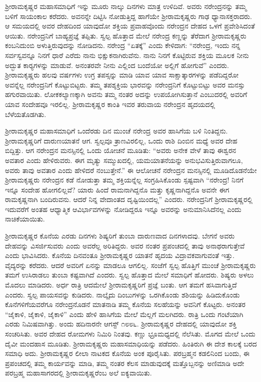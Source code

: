 ಶ‍್ರೀರಾಮಕೃಷ್ಣರ ಮಹಾಸಮಾಧಿಗೆ ಇನ್ನು ಮೂರು ನಾಲ್ಕು ದಿನಗಳು ಮಾತ್ರ ಉಳಿದಿವೆ. ಅವರು ನರೇಂದ್ರನನ್ನು ತಮ್ಮ ಬಳಿಗೆ ಸಾಯಂಕಾಲ ಕರೆದರು. ಅವನನ್ನೇ ದಿಟ್ಟಿಸಿ ನೋಡುತ್ತಿದ್ದ ಹಾಗೆಯೇ ಶ‍್ರೀರಾಮಕೃಷ್ಣರು ಗಾಢ ಧ್ಯಾನಾಸಕ್ತರಾದರು. ಆ ಸಮಯದಲ್ಲಿ ಅವರ ದೇಹದಿಂದ ಯಾವುದೋ ಶಕ್ತಿಯ ಪ್ರವಾಹವೊಂದು ನರೇಂದ್ರನ ದೇಹದ ಒಳಗೆ ಪ್ರವೇಶಿಸಿದಂತೆ ಆಯಿತು. ನರೇಂದ್ರನಿಗೆ ಬಾಹ್ಯಪ್ರಜ್ಞೆ ತಪ್ಪಿತು. ಸ್ವಲ್ಪ ಹೊತ್ತಾದ ಮೇಲೆ ನರೇಂದ್ರ ಕಣ್ಣನ್ನು ತೆರೆದಾಗ ಶ‍್ರೀರಾಮಕೃಷ್ಣರು ಕಂಬನಿದುಂಬಿ ಅಳುತ್ತಿರುವುದನ್ನು ನೋಡಿದನು. ನರೇಂದ್ರ “ಏತಕ್ಕೆ” ಎಂದು ಕೇಳಿದಾಗ: “ನರೇಂದ್ರ, ಇಂದು ನನ್ನ ಸರ್ವಸ್ವವನ್ನೂ ನಿನಗೆ ಧಾರೆ ಎರೆದು ನಾನು ಭಿಕ್ಷುಕನಾಗಿರುವೆನು. ನಾನು ನಿನಗೆ ಕೊಟ್ಟಿರುವ ಶಕ್ತಿಯ ಮೂಲಕ ನೀನು ಅದ್ಭುತ ಕಾರ‍್ಯಗಳನ್ನು ಮಾಡುವೆ. ಅನಂತರವೇ ನೀನು ಎಲ್ಲಿಂದ ಬಂದೆಯೋ ಅಲ್ಲಿಗೆ ಹೋಗುವೆ” ಎಂದರು. ಶ‍್ರೀರಾಮಕೃಷ್ಣರು ಹಲವು ವರ್ಷಗಳು ಉಗ್ರ ತಪಸ್ಸನ್ನು ಮಾಡಿ ಯಾವ ಯಾವ ಸಾಕ್ಷಾತ್ಕಾರಗಳನ್ನು ಪಡೆದಿದ್ದರೋ ಅವನ್ನೆಲ್ಲ ನರೇಂದ್ರನಿಗೆ ಕೊಟ್ಟುಬಿಟ್ಟರು. ತಮ್ಮ ತಪಶ್ಶಕ್ತಿಯ ಭಾರವನ್ನು ನರೇಂದ್ರನಿಗೆ ಕೊಟ್ಟುಬಿಟ್ಟು ಅವರ ಮನಸ್ಸು ಹಗುರವಾಯಿತು. ಲೋಕಕಲ್ಯಾಣಕ್ಕಾಗಿ ಅವನು ತಮ್ಮ ನಂತರ ಅದನ್ನು ಉಪಯೋಗಿಸುತ್ತಾನೆ ಎಂಬುದರಲ್ಲಿ ಅವರಿಗೆ ಯಾವ ಸಂದೇಹವೂ ಇರಲಿಲ್ಲ. ಶ‍್ರೀರಾಮಕೃಷ್ಣರ ಕಾಂತಿ ಇವರ ತರುವಾಯ ನರೇಂದ್ರನ ಹೃದಯದಲ್ಲಿ ಬೆಳೆಯತೊಡಗಿತು.

ಶ‍್ರೀರಾಮಕೃಷ್ಣರ ಮಹಾಸಮಾಧಿಗೆ ಒಂದೆರಡು ದಿನ ಮುಂಚೆ ನರೇಂದ್ರ ಅವರ ಹಾಸಿಗೆಯ ಬಳಿ ನಿಂತಿದ್ದನು. ಶ‍್ರೀರಾಮಕೃಷ್ಣರಿಗೆ ದಾರುಣಯಾತನೆ ಆಗ. ಸ್ವಲ್ಪವೂ ತ್ರಾಣವಿರಲಿಲ್ಲ, ಒಂದು ರಾಶಿ ದಿಂಬಿನ ಮಧ್ಯೆ ಅವರ ದೇಹ ಬಿದ್ದಿತ್ತು. ಆಗ ನರೇಂದ್ರನ ಮನಸ್ಸಿನಲ್ಲಿ ಒಂದು ಯೋಚನೆ ಮೂಡಿತು: “ಅವರು ಅನೇಕ ವೇಳೆ ತಾವು ಈಶ್ವರನ ಅವತಾರ ಎಂದು ಹೇಳಿರುವರು. ಈಗ ಮೃತ್ಯು ಸಮ್ಮುಖದಲ್ಲಿ, ಯಮಯಾತನೆಯನ್ನು ಅನುಭವಿಸುತ್ತಿರುವಾಗಲೂ, ಅವರು ತಾವು ಅವತಾರ ಎಂದು ಹೇಳಿದರೆ ನಂಬುತ್ತೇನೆ.” ಈ ಆಲೋಚನೆ ನರೇಂದ್ರನ ಮನಸ್ಸಿನಲ್ಲಿ ಮೂಡಿದೊಡನೆಯೇ ಶ‍್ರೀರಾಮಕೃಷ್ಣರು ನರೇಂದ್ರನ ಕಡೆ ನೋಡುತ್ತಾ ತಮ್ಮ ಶಕ್ತಿಯನ್ನೆಲ್ಲ ಸಂಗ್ರಹಿಸಿಕೊಂಡು ಸ್ಪಷ್ಟವಾಗಿ “ನರೇಂದ್ರ! ನಿನಗೆ ಇನ್ನೂ ಸಂದೇಹ ಹೋಗಲಿಲ್ಲವೆ? ಯಾರು ಹಿಂದೆ ರಾಮನಾಗಿದ್ದನೊ ಮತ್ತು ಕೃಷ್ಣನಾಗಿದ್ದನೊ ಅವನೇ ಈಗ ರಾಮಕೃಷ್ಣನಾಗಿ ಬಂದಿರುವನು. ಆದರೆ ನಿನ್ನ ವೇದಾಂತದ ದೃಷ್ಟಿಯಿಂದಲ್ಲ” ಎಂದರು. ನರೇಂದ್ರನಿಗೆ ಶ‍್ರೀರಾಮಕೃಷ್ಣರಲ್ಲಿ ಇದುವರೆಗೆ ಅಂತಹ ಆಧ್ಯಾತ್ಮಿಕ ಆವಿರ್ಭಾವಗಳನ್ನು ನೋಡಿದ್ದರೂ ಇನ್ನೂ ಅವರನ್ನು ಅನುಮಾನಿಸಿದೆನಲ್ಲ ಎಂದು ನಾಚಿಕೆಯಾಯಿತು.

ಶ‍್ರೀರಾಮಕೃಷ್ಣರ ಕೊನೆಯ ಎರಡು ದಿನಗಳು ಶಿಷ್ಯರಿಗೆ ತುಂಬಾ ದಾರುಣವಾದ ದಿನಗಳಾದವು. ಬೇಗನೆ ಅವರು ದೇಹವನ್ನು ವಿಸರ್ಜಿಸುವರು ಎಂದು ಅವರೆಲ್ಲ ಅರಿತಿದ್ದರು. ಅವರ ನಂತರ ಪ್ರಪಂಚದಲ್ಲಿ ತಾವು ಅನಾಥರಾಗುತ್ತೇವೆ ಎಂದು ಭಾವಿಸಿದರು. ಕೊನೆಯ ದಿನವಂತೂ ಶ‍್ರೀರಾಮಕೃಷ್ಣರ ಯಾತನೆ ಹೃದಯ ವಿದ್ರಾವಕವಾಗುವಂತೆ ಇತ್ತು. ವೈದ್ಯರನ್ನು ಕರೆದರು. ಆದರೆ ಅವರಿಗೆ ಏನನ್ನು ಮಾಡಲೂ ಆಗಲಿಲ್ಲ. ಸಂಜೆಗೆ ಸ್ವಲ್ಪ ಹೊತ್ತಿಗೆ ಮುಂಚೆ ಶ‍್ರೀರಾಮಕೃಷ್ಣರು ತಮಗೆ ಉಸಿರಾಡಲು ತುಂಬಾ ಕಷ್ಟವಾಗಿದೆ ಎಂದರು. ಸ್ವಲ್ಪ ಹೊತ್ತಾದ ಮೇಲೆ ಸಮಾಧಿಗೆ ಹೋದರು. ಶಿಷ್ಯರು ಅಳಲು ಮೊದಲು ಮಾಡಿದರು. ಅರ್ಧ ರಾತ್ರಿ ಆದಮೇಲೆ ಶ‍್ರೀರಾಮಕೃಷ್ಣರಿಗೆ ಪ್ರಜ್ಞೆ ಬಂತು. ಆಗ ತಮಗೆ ಹಸಿವಾಗುತ್ತಿದೆ ಎಂದರು. ಸ್ವಲ್ಪ ಪಾಯಸವನ್ನು ಕುಡಿದರು. ನಾಲ್ಕೈದು ದಿಂಬುಗಳನ್ನು ಒರಗಿಕೊಂಡು ಶಶಿಯನ್ನು ಹಿಡಿದುಕೊಂಡು ಕೊನೆಗಳಿಗೆಯವರೆಗೂ ನರೇಂದ್ರನೊಡನೆ ಮಾತನಾಡಿ ತಮ್ಮ ಕೊನೆಯ ಸಲಹೆಯನ್ನು ಅವನಿಗೆ ಕೊಟ್ಟರು. ಅನಂತರ “ಜೈಕಾಳಿ, ಜೈಕಾಳಿ, ಜೈಕಾಳಿ” ಎಂದು ಹೇಳಿ ಹಾಸಿಗೆಯ ಮೇಲೆ ಮೆಲ್ಲಗೆ ಮಲಗಿದರು. ರಾತ್ರಿ ಒಂದು ಗಂಟೆಯಾಗಿ ಎರಡು ನಿಮಿಷವಾಗಿತ್ತು. ಅಂದು ಹದಿನಾರನೇ ಆಗಸ್ಟ್ ೧೮೮೬. ಶ‍್ರೀರಾಮಕೃಷ್ಣರ ದೇಹದಲ್ಲಿ ಯಾವುದೋ ಶಕ್ತಿ ಸಂಚರಿಸಿತು. ಅವರ ದೇಹದ ರೋಮಗಳು ನಿಮಿರಿ ನಿಂತವು. ಕಣ್ಣು ಭ್ರೂಮಧ್ಯದಲ್ಲಿ ನೆಲೆಸಿತು. ಮೊಗದ ಮೇಲೆ ಒಂದು ದೈವೀ ಮಂದಹಾಸ ಮೂಡಿತು. ಶ‍್ರೀರಾಮಕೃಷ್ಣರು ಮಹಾಸಮಾಧಿಯನ್ನು ಪಡೆದರು. ಹಿಂತಿರುಗಿ ಈ ದೇಶ ಕಾಲಕ್ಕೆ ಬರದ ಸಮಾಧಿ ಅದು. ಶ‍್ರೀರಾಮಕೃಷ್ಣರ ಲೀಲಾ ನಾಟಕದ ಕೊನೆಯ ಅಂಕ ಪೂರೈಸಿತು. ಪರಬ್ರಹ್ಮನ ಕಡಲಿನಿಂದ ಬಂದು, ಈ ಪ್ರಪಂಚದಲ್ಲಿ ತಮ್ಮ ಕಾರ್ಯವನ್ನು ಮಾಡಿ, ತಮ್ಮ ನಂತರ ಕೆಲಸ ಮಾಡುವುದಕ್ಕೆ ಮತ್ತೊಬ್ಬನನ್ನು ಅಣಿಮಾಡಿ ಅದೇ ಪರಬ್ರಹ್ಮ ಮಹಾಸಾಗರದಲ್ಲಿ ಶ‍್ರೀರಾಮಕೃಷ್ಣರೆಂಬ ಅಲೆ ಐಕ್ಯವಾಯಿತು.

